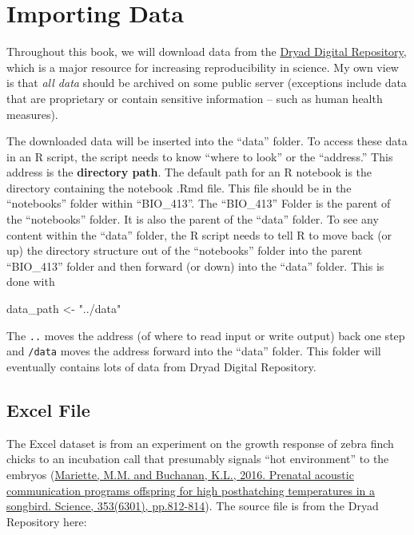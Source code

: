 \documentclass[]{book}
\newenvironment{Shaded}{\begin{snugshade}}{\end{snugshade}}
\newcommand{\StringTok}[1]{\textcolor[rgb]{0.31,0.60,0.02}{#1}}
\newcommand{\NormalTok}[1]{#1}
\begin{document}
\section{Importing Data}\label{importing-data}

Throughout this book, we will download data from the
\href{https://datadryad.org}{Dryad Digital Repository}, which is a major
resource for increasing reproducibility in science. My own view is that
\emph{all data} should be archived on some public server (exceptions
include data that are proprietary or contain sensitive information --
such as human health measures).

The downloaded data will be inserted into the ``data'' folder. To access
these data in an R script, the script needs to know ``where to look'' or
the ``address.'' This address is the \textbf{directory path}. The
default path for an R notebook is the directory containing the notebook
.Rmd file. This file should be in the ``notebooks'' folder within
``BIO\_413''. The ``BIO\_413'' Folder is the parent of the ``notebooks''
folder. It is also the parent of the ``data'' folder. To see any content
within the ``data'' folder, the R script needs to tell R to move back
(or up) the directory structure out of the ``notebooks'' folder into the
parent ``BIO\_413'' folder and then forward (or down) into the ``data''
folder. This is done with

\begin{Shaded}
\begin{Highlighting}[]
\NormalTok{data_path <-}\StringTok{ "../data"}
\end{Highlighting}
\end{Shaded}

The \texttt{..} moves the address (of where to read input or write
output) back one step and \texttt{/data} moves the address forward into
the ``data'' folder. This folder will eventually contains lots of data
from Dryad Digital Repository.

\subsection{Excel File}\label{excel-file}

The Excel dataset is from an experiment on the growth response of zebra
finch chicks to an incubation call that presumably signals ``hot
environment'' to the embryos
(\href{http://science.sciencemag.org/content/353/6301/812}{Mariette,
M.M. and Buchanan, K.L., 2016. Prenatal acoustic communication programs
offspring for high posthatching temperatures in a songbird. Science,
353(6301), pp.812-814}). The source file is from the Dryad Repository
here:
\end{document}

